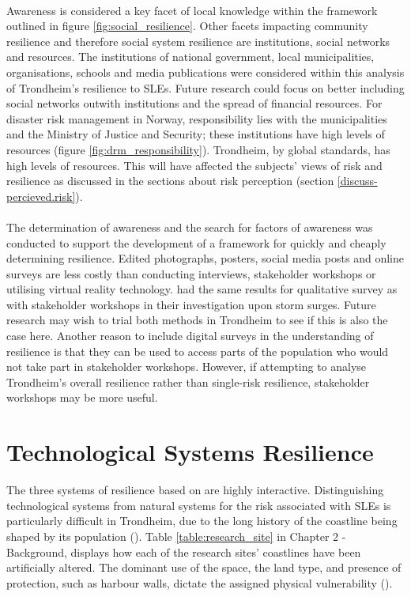\paragraph{}
Awareness is considered a key facet of local knowledge within the framework outlined in figure \ref{fig:social_resilience}. Other facets impacting community resilience and therefore social system resilience are institutions, social networks and resources. The institutions of national government, local municipalities, organisations, schools and media publications were considered within this analysis of Trondheim's resilience to SLEs. Future research could focus on better including social networks outwith institutions and the spread of financial resources. For disaster risk management in Norway, responsibility lies with the municipalities and the Ministry of Justice and Security; these institutions have high levels of resources (figure \ref{fig:drm_responsibility}). Trondheim, by global standards, has high levels of resources. This will have affected the subjects' views of risk and resilience as discussed in the sections about risk perception (section \ref{discuss-percieved.risk}). 
\paragraph{}
The determination of awareness and the search for factors of awareness was conducted to support the development of a framework for quickly and cheaply determining resilience. Edited photographs, posters, social media posts and online surveys are less costly than conducting interviews, stakeholder workshops or utilising virtual reality technology. \cite{gerkensmeier_governing_2018} had the same results for qualitative survey as with stakeholder workshops in their investigation upon storm surges. Future research may wish to trial both methods in Trondheim to see if this is also the case here. Another reason to include digital surveys in the understanding of resilience is that they can be used to access parts of the population who would not take part in stakeholder workshops. However, if attempting to analyse Trondheim's overall resilience rather than single-risk resilience, stakeholder workshops may be more useful.


\section{Technological Systems Resilience}\label{tech-resilience-discussion}
The three systems of resilience based on \cite{cutter_place-based_2008} are highly interactive. Distinguishing technological systems from natural systems for the risk associated with SLEs is particularly difficult in Trondheim, due to the long history of the coastline being shaped by its population (\cite{sjavik_z_2010}). Table \ref{table:research_site} in Chapter 2 - Background, displays how each of the research sites' coastlines have been artificially altered. The dominant use of the space, the land type, and presence of protection, such as harbour walls, dictate the assigned physical vulnerability (\cite{opach_seeking_2020}).
